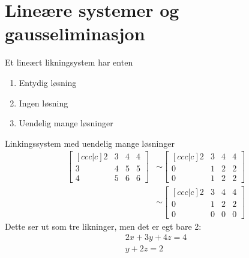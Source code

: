 \documentclass[11pt, a4paper, norsk]{article}
\begin{document}
        \section{Lineære systemer og gausseliminasjon}
        \begin{Theorem}{}{}
            Et lineært likningsystem har enten
            \begin{enumerate}
                \item Entydig løsning
                \item Ingen løsning 
                \item Uendelig mange løsninger
            \end{enumerate}
        \end{Theorem}

        \begin{Example}{Linkingssystem med uendelig mange løsninger}{}
           \begin{align*}
               \begin{bmatrix}[ccc|c]
                    2 & 3 & 4 & 4 \\
                    3 & 4 & 5 & 5 \\
                    4 & 5 & 6 & 6
                    \end{bmatrix} &\sim \begin{bmatrix}[ccc|c]
                                        2 & 3 & 4 & 4 \\
                                        0 & 1 & 2 & 2 \\
                                        0 & 1 & 2 & 2
                                    \end{bmatrix}
                                    \\
                                    &\sim \begin{bmatrix}[ccc|c]
                                        2 & 3 & 4 & 4 \\
                                        0 & 1 & 2 & 2 \\
                                        0 & 0 & 0 & 0
                                    \end{bmatrix}
           \end{align*}
           Dette ser ut som tre likninger, men det er egt bare 2:
           \begin{align*}
            2x + 3y + 4z = 4 \\
            y + 2z = 2               
           \end{align*}


\end{Example}
\end{document}
